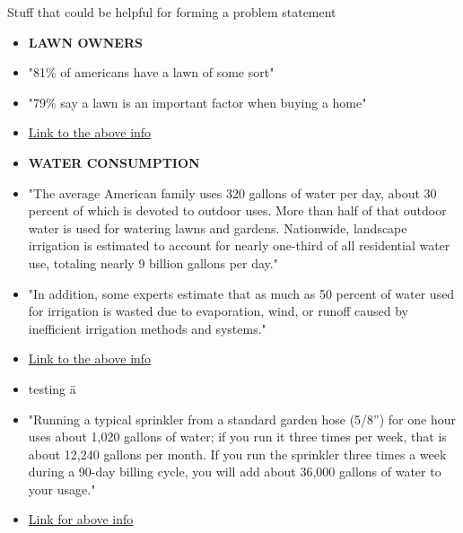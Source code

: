 \documentclass[]{article}
\begin{document}
	Stuff that could be helpful for forming a problem statement
	\begin{itemize}	
		\item \textbf{LAWN OWNERS}
		\item "81\% of americans have a lawn of some sort" 
		\item "79\% say a lawn is an important factor when buying a home" 
		\item \href{https://www.businesswire.com/news/home/20190401005679/en/New-Research-Confirms-Americans-Lawns-Green-Spaces}{Link to the above info}
		\item \textbf{WATER CONSUMPTION}
		\item "The average American family uses 320 gallons of water per day, about 30 percent of which is devoted to outdoor uses. More than half of that outdoor water is used for watering lawns and gardens. Nationwide, landscape irrigation is estimated to account for nearly one-third of all residential water use, totaling nearly 9 billion gallons per day."
		\item "In addition, some experts estimate that as much as 50 percent of water used for irrigation is wasted due to evaporation, wind, or runoff caused by inefficient irrigation methods and systems."
		\item \href{https://19january2017snapshot.epa.gov/www3/watersense/pubs/outdoor.html}{Link to the above info}
		\item testing \"a
		\item "Running a typical sprinkler from a standard garden hose (5/8”) for one hour uses about 1,020 gallons of water; if you run it three times per week, that is about 12,240 gallons per month. If you run the sprinkler three times a week during a 90-day billing cycle, you will add about 36,000 gallons of water to your usage."
	\item \href{https://www.wsscwater.com/customer-service/rates/water-usage.html}{Link for above info}
	
		
	\end{itemize}
\end{document}
